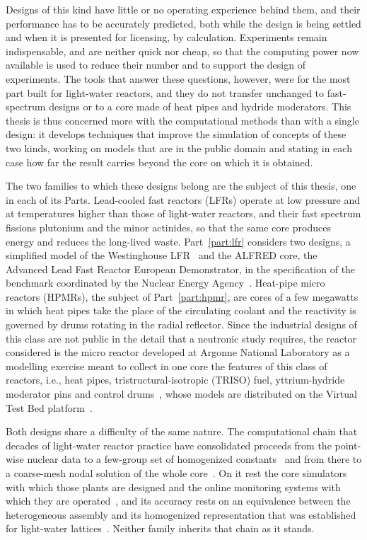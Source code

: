 Designs of this kind have little or no operating experience behind them, and their
performance has to be accurately predicted, both while the design is being settled and
when it is presented for licensing, by calculation. Experiments remain
indispensable, and are neither quick nor cheap, so that the computing power now
available is used to reduce their number and to support the design of
experiments. The tools that answer these questions, however, were for the most part
built for light-water reactors, and they do not transfer unchanged to fast-spectrum
designs or to a core made of heat pipes and hydride moderators. This thesis is
thus concerned more with the computational methods than with a single design: it develops
techniques that improve the simulation of concepts of these two kinds, working
on models that are in the public domain and stating in each case how far the
result carries beyond the core on which it is obtained.

The two families to which these designs belong are the subject of this thesis,
one in each of its Parts. Lead-cooled fast reactors (LFRs) operate at low
pressure and at temperatures higher than those of light-water reactors, and
their fast spectrum fissions plutonium and the minor actinides, so that the same
core produces energy and reduces the long-lived waste. Part~\ref{part:lfr}
considers two designs, a simplified model of the Westinghouse
LFR~\cite{wecLFR} and the ALFRED core, the Advanced Lead Fast Reactor
European Demonstrator, in the specification of the benchmark coordinated by the Nuclear
Energy Agency~\cite{neaBench}. Heat-pipe micro
reactors (HPMRs), the subject of Part~\ref{part:hpmr}, are cores of a few
megawatts in which heat pipes take the place of the circulating coolant and the
reactivity is governed by drums rotating in the radial reflector. Since the
industrial designs of this class are not public in the detail that a
neutronic study requires, the reactor considered is the micro reactor developed
at Argonne National Laboratory as a modelling exercise meant to collect in one
core the features of this class of reactors, i.e., heat pipes, tristructural-isotropic
(TRISO) fuel,
yttrium-hydride moderator pins and control drums~\cite{Stauff2024}, whose models
are distributed on the Virtual Test Bed platform~\cite{moose_vtb_mrad_description}.

Both designs share a difficulty of the same nature. The computational chain that decades
of light-water reactor practice have consolidated proceeds from the point-wise
nuclear data to a few-group set of homogenized constants~\cite{cacuci2010handbook}
and from there to a coarse-mesh nodal solution of the whole
core~\cite{Lawrence1986,Smith1986}. On it rest the core simulators with which
those plants are designed and the online monitoring systems with which they are
operated~\cite{BoydMiller1996}, and its accuracy rests on an equivalence between
the heterogeneous assembly and its homogenized representation that was
established for light-water lattices~\cite{Smith1986}. Neither family inherits
that chain as it stands.

